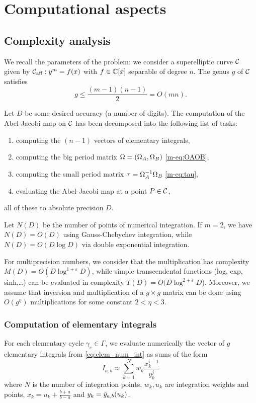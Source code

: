 \documentclass[main.tex]{subfiles}
\begin{document}
  \section{Computational aspects}

   \subsection{Complexity analysis}

   We recall the parameters of the problem: we consider a superelliptic curve $\mathcal{C}$ given by
   $\mathcal{C}_{\text{aff}}:y^m=f(x)$ with $f \in \mathbb{C}[x]$ separable of degree $n$. The genus $g$ of $\mathcal{C}$ satisfies
   $$g \leq \frac{(m-1)(n-1)}2=O(mn).$$

   Let $D$ be some desired accuracy (a number of digits). The computation of
   the Abel-Jacobi map on $\mathcal{C}$ has been decomposed into the
   following list of tasks:
   \begin{enumerate}
       \item computing the $(n-1)$ vectors of elementary integrals,
       \item computing the big period matrix $\Omega=(\Omega_A,\Omega_B)$ \eqref{m-eq:OAOB},
       \item computing the small period matrix $\tau = \Omega_A^{-1}\Omega_B$ \eqref{m-eq:tau},
       \item evaluating the Abel-Jacobi map at a point $P \in \mathcal{C}$,
   \end{enumerate}
   all of these to absolute precision $D$.

   Let $N(D)$ be the number of points of numerical integration.
   If $m=2$, we have
   $N(D)=O(D)$ using Gauss-Chebychev integration, while $N(D)=O(D\log D)$
   via double exponential integration.

   For multiprecision numbers, we consider that the multiplication has
   complexity $M(D)=O(D \log^{1+\varepsilon}D)$,
   while simple transcendental functions (log, exp, sinh,\dots) can be evaluated
   in complexity $T(D)=O(D\log^{2+\varepsilon} D$).
    Moreover, we assume that inversion and multiplication of a $g \times g$ matrix can be done using
    $O(g^{\eta})$ multiplications for some constant $2 < \eta < 3$.
   
   \subsubsection{Computation of elementary integrals}

   For each elementary cycle $\gamma_e\in \Gamma$, we evaluate numerically the vector of $g$
   elementary integrals from \eqref{eq:elem_num_int} as sums of the form
   \begin{equation}
       I_{a,b} \approx \sum_{k=1}^N w_k\frac{x_k^{i-1}}{y_k^j}
   \end{equation}
   where $N$ is the number of integration points, $w_k,u_k$ are integration weights and points,
   $x_k=u_k+\frac{b+a}{b-a}$ and $y_k=\tilde{y}_{a,b}(u_k)$.
\end{document}

